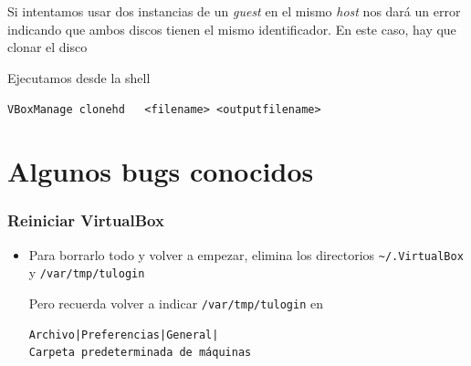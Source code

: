 \documentclass[ucs]{beamer}
\begin{document}
\begin{frame}[fragile]

Si intentamos usar dos instancias de un \emph{guest} en 
el mismo \emph{host} nos dará un error indicando que ambos
discos tienen el mismo identificador. En este caso, hay que
clonar el disco

Ejecutamos desde la shell

\verb|VBoxManage clonehd   <filename> <outputfilename>|
\end{frame}


\section{Algunos bugs conocidos}

\begin{frame}[fragile]
\frametitle{Reiniciar VirtualBox}
\begin{itemize}
\item
Para borrarlo todo y volver a empezar, elimina los directorios  \verb|~/.VirtualBox| y \verb|/var/tmp/tulogin|

\begin{scriptsize}
Pero recuerda volver a indicar \verb|/var/tmp/tulogin| en
\begin{verbatim}
Archivo|Preferencias|General|
Carpeta predeterminada de máquinas
\end{verbatim}
\end{scriptsize}
\end{itemize}

\end{frame}

\end{document}
